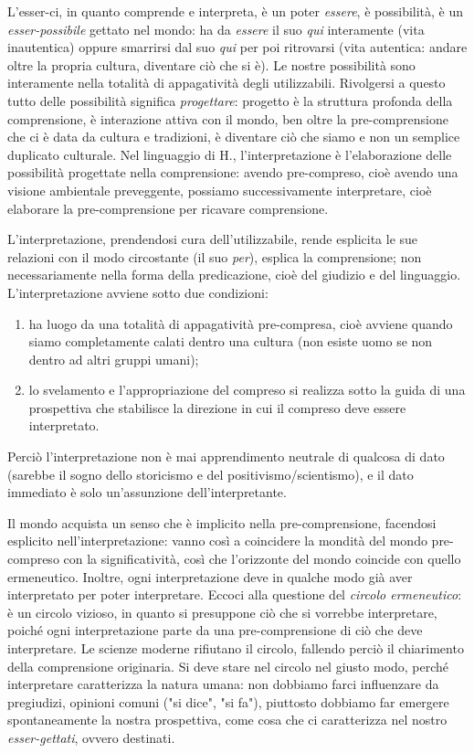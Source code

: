 \documentclass[a4paper,12pt,oneside]{article}%
\begin{document}
L'esser-ci, in quanto comprende e interpreta, è un poter \textit{essere}, è possibilità, è un \textit{esser-possibile} gettato nel mondo: ha da \textit{essere} il suo \textit{qui} interamente (vita inautentica) oppure smarrirsi dal suo \textit{qui}  per poi ritrovarsi (vita autentica: andare oltre la propria cultura, diventare ciò che si è).
Le nostre possibilità sono interamente nella totalità di appagatività degli utilizzabili. Rivolgersi a questo tutto delle possibilità significa \textit{progettare}: progetto è la struttura profonda della comprensione, è interazione attiva con il mondo, ben oltre la pre-comprensione che ci è data da cultura e tradizioni, è diventare ciò che siamo e non un semplice duplicato culturale. Nel linguaggio di H., l'interpretazione è l'elaborazione delle possibilità progettate nella comprensione: avendo pre-compreso, cioè avendo una visione ambientale preveggente, possiamo successivamente interpretare, cioè elaborare la pre-comprensione per ricavare comprensione.

L'interpretazione, prendendosi cura dell'utilizzabile, rende esplicita le sue relazioni con il modo circostante (il suo \textit{per}), esplica la comprensione; non necessariamente nella forma della predicazione, cioè del giudizio e del linguaggio. L'interpretazione avviene sotto due condizioni:

\begin{enumerate}
	\item ha luogo da una totalità di appagatività pre-compresa, cioè avviene quando siamo completamente calati dentro una cultura (non esiste uomo se non dentro ad altri gruppi umani);
	\item lo svelamento e l'appropriazione del compreso si realizza sotto la guida di una prospettiva che stabilisce la direzione in cui il compreso deve essere interpretato.
\end{enumerate}

Perciò l'interpretazione non è mai apprendimento neutrale di qualcosa di dato (sarebbe il sogno dello storicismo e del positivismo/scientismo), e il dato immediato è solo un'assunzione dell'interpretante.

Il mondo acquista un senso che è implicito nella pre-comprensione, facendosi esplicito nell'interpretazione: vanno così a coincidere la mondità del mondo pre-compreso con la significatività, così che l'orizzonte del mondo coincide con quello ermeneutico. Inoltre, ogni interpretazione deve in qualche modo già aver interpretato per poter interpretare. Eccoci alla questione del \textit{circolo ermeneutico}: è un circolo vizioso, in quanto si presuppone ciò che si vorrebbe interpretare, poiché ogni interpretazione parte da una pre-comprensione di ciò che deve interpretare. Le scienze moderne rifiutano il circolo, fallendo perciò il chiarimento della comprensione originaria. Si deve stare nel circolo nel giusto modo, perché interpretare caratterizza la natura umana: non dobbiamo farci influenzare da pregiudizi, opinioni comuni ("si dice", "si fa"), piuttosto dobbiamo far emergere spontaneamente la nostra prospettiva, come cosa che ci caratterizza nel nostro \textit{esser-gettati}, ovvero destinati.
\end{document}
